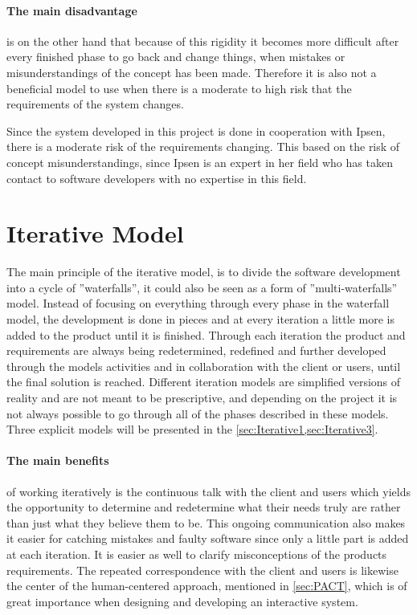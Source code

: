 \paragraph{The main disadvantage} is on the other hand that because of this rigidity it becomes more difficult after every finished phase to go back and change things, when mistakes or misunderstandings of the concept has been made.
Therefore it is also not a beneficial model to use when there is a moderate to high risk that the requirements of the system changes.

Since the system developed in this project is done in cooperation with Ipsen, there is a moderate risk of the requirements changing.
This based on the risk of concept misunderstandings, since Ipsen is an expert in her field who has taken contact to software developers with no expertise in this field.

\section{Iterative Model} \label{sec:iterativModel}
The main principle of the iterative model, \cite{Iterative-Toolsqa,InteractionDesign} is to divide the software development into a cycle of ''waterfalls'', it could also be seen as a form of ''multi-waterfalls'' model.
Instead of focusing on everything through every phase in the waterfall model, the development is done in pieces and at every iteration a little more is added to the product until it is finished.
Through each iteration the product and requirements are always being redetermined, redefined and further developed through the models activities and in collaboration with the client or users, until the final solution is reached.
Different iteration models are simplified versions of reality and are not meant to be prescriptive, and depending on the project it is not always possible to go through all of the phases described in these models. 
Three explicit models will be presented in the \cref{sec:Iterative1,sec:Iterative3}.


\paragraph{The main benefits}
of working iteratively is the continuous talk with the client and users which yields the opportunity to determine and redetermine what their needs truly are rather than just what they believe them to be.
This ongoing communication also makes it easier for catching mistakes and faulty software since only a little part is added at each iteration.
It is easier as well to clarify misconceptions of the products requirements.
The repeated correspondence with the client and users is likewise the center of the human-centered approach, mentioned in \cref{sec:PACT}, which is of great importance when designing and developing an interactive system.

